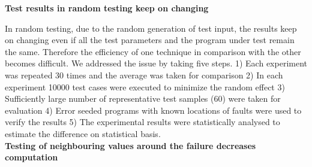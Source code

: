 








\textbf{Test results in random testing keep on changing} 

In random testing, due to the random generation of test input, the results keep on changing even if all the test parameters and the program under test remain the same. Therefore the efficiency of one technique in comparison with the other becomes difficult. We addressed  the issue by taking five steps. 1) Each experiment was repeated 30 times and the average was taken for comparison 2) In each experiment 10000 test cases were executed to minimize the random effect 3) Sufficiently large number of representative test samples (60) were taken for evaluation 4) Error seeded programs with known locations of faults were used to verify the results 5) The experimental results were statistically analysed to estimate the difference on statistical basis.\\


   
\textbf{Testing of neighbouring values around the failure decreases computation}


